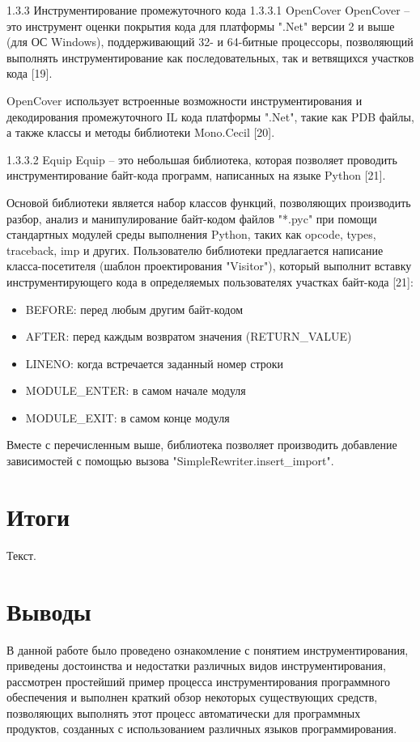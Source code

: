 1.3.3 Инструментирование промежуточного кода
1.3.3.1 OpenCover
OpenCover -- это инструмент оценки покрытия кода для платформы ".Net" версии 2 и выше (для ОС Windows), поддерживающий 32- и 64-битные процессоры, позволяющий выполнять инструментирование как последовательных, так и ветвящихся участков кода [19].

OpenCover использует встроенные возможности инструментирования и декодирования промежуточного IL кода платформы ".Net", такие как PDB файлы, а также классы и методы библиотеки Mono.Cecil [20].

1.3.3.2 Equip
Equip -- это небольшая библиотека, которая позволяет проводить инструментирование байт-кода программ, написанных на языке Python [21].

Основой библиотеки является набор классов функций, позволяющих производить разбор, анализ и манипулирование байт-кодом файлов "*.pyc" при помощи стандартных модулей среды выполнения Python, таких как opcode, types, traceback, imp и других. Пользователю библиотеки предлагается написание класса-посетителя (шаблон проектирования "Visitor"), который выполнит вставку инструментирующего кода в определяемых пользователях участках байт-кода [21]:

\begin{itemize}
  \item BEFORE: перед любым другим байт-кодом
  \item AFTER: перед каждым возвратом значения (RETURN\_VALUE)
  \item LINENO: когда встречается заданный номер строки
  \item MODULE\_ENTER: в самом начале модуля
  \item MODULE\_EXIT: в самом конце модуля
\end{itemize}

Вместе с перечисленным выше, библиотека позволяет производить добавление зависимостей с помощью вызова "SimpleRewriter.insert\_import".

\section{Итоги}

Текст.

\section{Выводы}

В данной работе было проведено ознакомление с понятием инструментирования, приведены достоинства и недостатки различных видов инструментирования, рассмотрен простейший пример процесса инструментирования программного обеспечения и выполнен краткий обзор некоторых существующих средств, позволяющих выполнять этот процесс автоматически для программных продуктов, созданных с использованием различных языков программирования.
